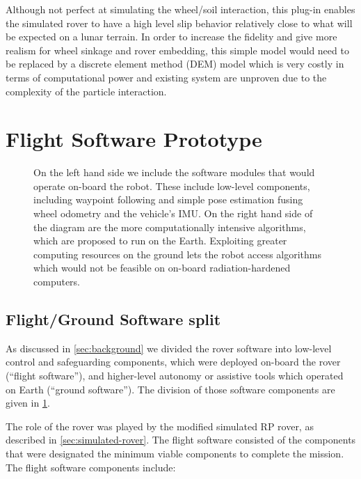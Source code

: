 \documentclass[twocolumn,letterpaper]{IEEEAerospaceCLS}  %
\begin{document}
Although not perfect at simulating the wheel/soil interaction, this plug-in enables the simulated rover to have a high level slip behavior relatively close to what will be expected on a lunar terrain. 
In order to increase the fidelity and give more realism for wheel sinkage and rover embedding, this simple model would need to be replaced by a discrete element method (DEM) model which is very costly in terms of computational power and existing system are unproven due to the complexity of the particle interaction.

\section{Flight Software Prototype}

\begin{figure}
\centering
{}
\caption{On the left hand side we include the software modules that would operate on-board the robot.  
These include low-level components, including waypoint following and simple pose estimation fusing wheel odometry and the vehicle's IMU.  
On the right hand side of the diagram are the more computationally intensive algorithms, which are proposed to run on the Earth.  
Exploiting greater computing resources on the ground lets the robot access algorithms which would not be feasible on on-board radiation-hardened computers. \label{fig:rp-software}}
\end{figure}


\subsection{Flight/Ground Software split}

As discussed in \cref{sec:background} we divided the rover software into low-level control and safeguarding components, which were deployed on-board the rover (``flight software''), and higher-level autonomy or assistive tools which operated on Earth (``ground software'').  
The division of those software components are given in \cref{fig:rp-software}.   

The role of the rover was played by the modified simulated RP rover, as described in \cref{sec:simulated-rover}.  The flight software consisted of the components that were designated the minimum viable components to complete the mission.  The flight software components include:
\end{document}
